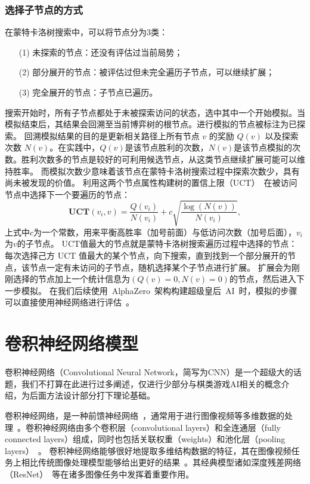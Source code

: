 \subsubsection{选择子节点的方式}
在蒙特卡洛树搜索中，可以将节点分为3类：

\begin{itemize}
    \item [(1)] 
    未探索的节点：还没有评估过当前局势；
    \item [(2)]
    部分展开的节点：被评估过但未完全遍历子节点，可以继续扩展；
    \item [(3)]
    完全展开的节点：子节点已遍历。
\end{itemize}

搜索开始时，所有子节点都处于未被探索访问的状态，选中其中一个开始模拟。当模拟结束后，其结果会回溯至当前博弈树的根节点。进行模拟的节点被标注为已探索。
回溯模拟结果的目的是更新相关路径上所有节点 $v$ 的奖励 $Q(v)$ 以及探索次数 $N(v)$。在实践中，$Q(v)$是该节点胜利的次数，$N(v)$是该节点模拟的次数。胜利次数多的节点是较好的可利用候选节点，从这类节点继续扩展可能可以维持胜率。
而模拟次数少意味着该节点在蒙特卡洛树搜索过程中探索次数少，具有尚未被发现的价值。
利用这两个节点属性构建树的置信上限（UCT）~\cite{10.1007/11871842_29}在被访问节点中选择下一个要遍历的节点：
\begin{equation*}
    \textbf{UCT}(v_{i},v) = \frac{Q(v_{i})}{N(v_{i})} + c\sqrt{\frac{\log(N(v))}{N(v_{i})}},
\end{equation*}
上式中$c$为一个常数，用来平衡高胜率（加号前面）与低访问次数（加号后面），$v_{i}$为$v$的子节点。
UCT值最大的节点就是蒙特卡洛树搜索遍历过程中选择的节点：每次选择己方 UCT 值最大的某个节点，向下搜索，直到找到一个部分展开的节点，该节点一定有未访问的子节点，随机选择某个子节点进行扩展。
扩展会为刚刚选择的节点加上一个统计信息为$(Q(v)=0,N(v)=0)$的节点，然后进入下一步模拟。
在我们后续使用~AlphaZero~架构构建超级皇后~AI~时，模拟的步骤可以直接使用神经网络进行评估~\cite{Silver1140,Silver2017,Silver2016}。

\section{卷积神经网络模型}
卷积神经网络（Convolutional Neural Network，简写为CNN）是一个超级大的话题，我们不打算在此进行过多阐述，仅进行少部分与棋类游戏AI相关的概念介绍，为后面方法设计部分打下理论基础。

卷积神经网络，是一种前馈神经网络~\cite{SCHMIDHUBER201585}，通常用于进行图像视频等多维数据的处理~\cite{NIPS2012_4824}。卷积神经网络由多个卷积层（convolutional layers）和全连通层（fully connected layers）组成，同时也包括关联权重（weights）和池化层（pooling layers）~\cite{venkatesan2017convolutional}。
卷积神经网络能够很好地提取多维结构数据的特征，其在图像视频任务上相比传统图像处理模型能够给出更好的结果~\cite{VALUEVA2020232}。其经典模型诸如深度残差网络（ResNet）~\cite{resnet}等在诸多图像任务中发挥着重要作用。


